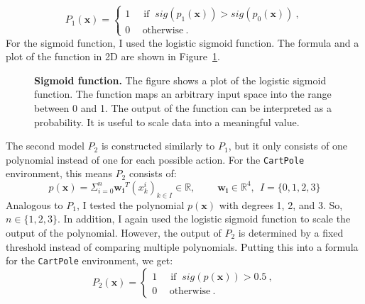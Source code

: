 \[
  P_1(\mathbf{x}) =
  \begin{cases}1~&{\text{ if }}~sig(p_1(\mathbf{x})) > sig(p_0(\mathbf{x}))~,\\0~&~\text{otherwise}~.\end{cases}
\]
For the sigmoid function, I used the logistic sigmoid function. The formula and a plot of the function in 2D are shown in Figure~\ref{fig:sigmoid}.
\begin{figure}[ht]
\centering
{}
\caption[Sigmoid function]{
  \textbf{Sigmoid function.}
  The figure shows a plot of the logistic sigmoid function. The function maps an arbitrary input space into the range between 0 and 1. The output of the function can be interpreted as a probability. It is useful to scale data into a meaningful value.
}
\label{fig:sigmoid}
\end{figure}

The second model $P_2$ is constructed similarly to $P_1$, but it only consists of one polynomial instead of one for each possible action. For the \verb|CartPole| environment, this means $P_2$ consists of:
\[
  p(\mathbf{x}) = \Sigma_{i=0}^{n} \mathbf{w_i}^T (x_k^i)_{k \in I} \in \mathbb{R}, \ \ \ \ \ \ \ \ \ \ \mathbf{w_i} \in \mathbb{R}^4, \ \ I = \{0, 1, 2, 3\}
\]
Analogous to $P_1$, I tested the polynomial $p(\mathbf{x})$ with degrees 1, 2, and 3. So, $n \in \{1, 2, 3\}$. In addition, I again used the logistic sigmoid function to scale the output of the polynomial. However, the output of $P_2$ is determined by a fixed threshold instead of comparing multiple polynomials. Putting this into a formula for the \verb|CartPole| environment, we get:
\[
  P_2(\mathbf{x}) =
  \begin{cases}1~&{\text{ if }}~sig(p(\mathbf{x}))>0.5~,\\0~&~\text{otherwise}~.\end{cases}
\]


